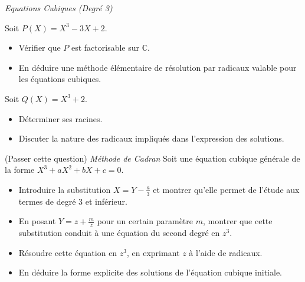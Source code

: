 \documentclass[10pt,a4paper]{article}
\begin{document}
\bigskip
\textit{Equations Cubiques (Degré 3)}

\q Soit \( P(X) = X^3 - 3X + 2 \).
\begin{itemize}
    \item Vérifier que \( P \) est factorisable sur \( \mathbb{C} \).
    \item En déduire une méthode élémentaire de résolution par radicaux valable pour les équations
    cubiques.
\end{itemize}

\q Soit \( Q(X) = X^3 + 2 \).
\begin{itemize}
    \item Déterminer ses racines.
    \item Discuter la nature des radicaux impliqués dans l'expression des solutions.
\end{itemize}

\q (Passer cette question) \textit{Méthode de Cadran} Soit une équation cubique générale de la forme \( X^3 + aX^2 + bX + c = 0 \).
\begin{itemize}
    \item Introduire la substitution \( X = Y - \frac{a}{3} \) et montrer qu'elle permet de l'étude
    aux termes de degré 3 et inférieur.
    \item En posant \( Y = z + \frac{m}{z} \) pour un certain paramètre \( m \), montrer que
    cette substitution conduit à une équation du second degré en \( z^3 \).
    \item Résoudre cette équation en \( z^3 \), en exprimant \( z \) à l'aide de radicaux.
    \item En déduire la forme explicite des solutions de l'équation cubique initiale.
\end{itemize}
\end{document}
